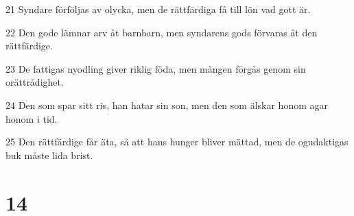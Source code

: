 \par 21 Syndare förföljas av olycka, men de rättfärdiga få till lön vad gott är.
\par 22 Den gode lämnar arv åt barnbarn, men syndarens gods förvaras åt den rättfärdige.
\par 23 De fattigas nyodling giver riklig föda, men mången förgås genom sin orättrådighet.
\par 24 Den som spar sitt ris, han hatar sin son, men den som älskar honom agar honom i tid.
\par 25 Den rättfärdige får äta, så att hans hunger bliver mättad, men de ogudaktigas buk måste lida brist.

\chapter{14}

